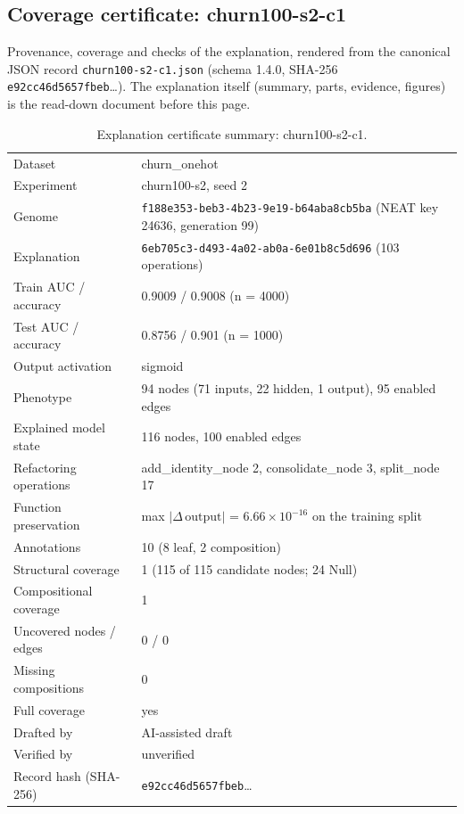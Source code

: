 \providecommand{\explaneatcertdir}[1]{}
\begin{drafted}
\section{Coverage certificate: churn100-s2-c1}\label{app:churn100-s2-c1:sec}
Provenance, coverage and checks of the explanation, rendered from the canonical JSON record \texttt{churn100-s2-c1.json} (schema 1.4.0, SHA-256 \texttt{e92cc46d5657fbeb}\ldots). The explanation itself (summary, parts, evidence, figures) is the read-down document before this page.

\begin{table}[htbp]
\centering\small
\begin{tabularx}{\linewidth}{@{}lX@{}}
\toprule
Dataset & churn\_\allowbreak{}onehot \\
Experiment & churn100-s2, seed 2 \\
Genome & \texttt{f188e353-beb3-4b23-9e19-b64aba8cb5ba} (NEAT key 24636, generation 99) \\
Explanation & \texttt{6eb705c3-d493-4a02-ab0a-6e01b8c5d696} (103 operations) \\
Train AUC / accuracy & 0.9009 / 0.9008 (n = 4000) \\
Test AUC / accuracy & 0.8756 / 0.901 (n = 1000) \\
Output activation & sigmoid \\
Phenotype & 94 nodes (71 inputs, 22 hidden, 1 output), 95 enabled edges \\
Explained model state & 116 nodes, 100 enabled edges \\
Refactoring operations & add\_\allowbreak{}identity\_\allowbreak{}node 2, consolidate\_\allowbreak{}node 3, split\_\allowbreak{}node 17 \\
Function preservation & max $|\Delta\,\mathrm{output}|$ = $6.66\times 10^{-16}$ on the training split \\
Annotations & 10 (8 leaf, 2 composition) \\
Structural coverage & 1 (115 of 115 candidate nodes; 24 Null) \\
Compositional coverage & 1 \\
Uncovered nodes / edges & 0 / 0 \\
Missing compositions & 0 \\
Full coverage & yes \\
Drafted by & AI-assisted draft \\
Verified by & unverified \\
Record hash (SHA-256) & \texttt{e92cc46d5657fbeb}\ldots \\
\bottomrule
\end{tabularx}
\caption{Explanation certificate summary: churn100-s2-c1.}
\label{app:churn100-s2-c1:summary}
\end{table}

\end{drafted}
